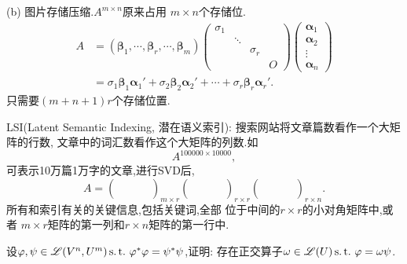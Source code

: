 \begin{asparaenum}[(1)]
  (b) 图片存储压缩.$A^{m\times n}$原来占用
  $m\times n$个存储位.
  \begin{align*}
    A & = (\bm{\beta}_1,\cdots,\bm{\beta}_r,\cdots,\bm{\beta}_m)
    \begin{pmatrix}
      \sigma_1&&&\\
      &\ddots&&\\
      &&\sigma_r&\\
      &&&O
    \end{pmatrix}\begin{pmatrix}
      \bm{\alpha}_1\\\bm{\alpha}_2\\\vdots\\\bm{\alpha}_n
    \end{pmatrix}\\
    & = \sigma_1\bm{\beta}_1\bm{\alpha}_1'+\sigma_2\bm{\beta}_2\bm{\alpha}_2'+\cdots+\sigma_r\bm{\beta}_r\bm{\alpha}_r'.
  \end{align*}
  只需要$(m+n+1)r$个存储位置.
\item LSI(Latent Semantic Indexing, 潜在语义索引):
  搜索网站将文章篇数看作一个大矩阵的行数,
  文章中的词汇数看作这个大矩阵的列数.如
  \[
    A^{100000\times 10000},
  \]
  可表示10万篇1万字的文章,进行SVD后,
  \[
    A=\begin{pmatrix}
      &&&\\
      &&&\\
      &&&\\
      &&&
    \end{pmatrix}_{m\times r}
    \begin{pmatrix}
      &&&\\
      &&&\\
      &&&\\
      &&&
    \end{pmatrix}_{r\times r}
    \begin{pmatrix}
      &&&\\
      &&&\\
      &&&\\
      &&&
    \end{pmatrix}_{r\times n}.
  \]
  所有和索引有关的关键信息,包括关键词,全部
  位于中间的$r\times r$的小对角矩阵中,或者
  $m\times r$矩阵的第一列和$r\times n$矩阵的第一行中.
\end{asparaenum}

\begin{example}
  设$\varphi, \psi\in \mathscr{L}(V^n,U^m) \operatorname{{}s.t.{}}
  \varphi^*\varphi = \psi^*\psi$,证明:
  存在正交算子$\omega\in \mathscr{L}(U) \operatorname{{}s.t.{}}
  \varphi=\omega\psi$.
\end{example}

